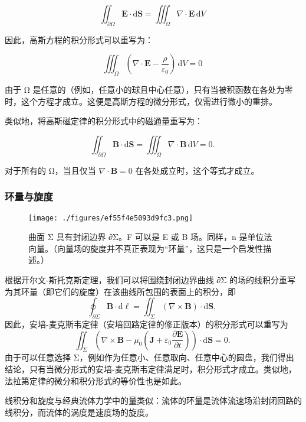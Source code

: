 \[\iint_{\scriptstyle \partial \Omega} \mathbf{E} \cdot \mathrm{d} \mathbf{S} = \iiint_{\Omega} \nabla \cdot \mathbf{E} \, \mathrm{d} V~\]

因此，高斯方程的积分形式可以重写为：

\[\iiint_{\Omega} \left(\nabla \cdot \mathbf{E} - \frac{\rho}{\varepsilon_0}\right) \, \mathrm{d} V = 0~\]

由于 Ω 是任意的（例如，任意小的球且中心任意），只有当被积函数在各处为零时，这个方程才成立。这便是高斯方程的微分形式，仅需进行微小的重排。

类似地，将高斯磁定律的积分形式中的磁通量重写为：

\[\iint_{\scriptstyle \partial \Omega} \mathbf{B} \cdot \mathrm{d} \mathbf{S} = \iiint_{\Omega} \nabla \cdot \mathbf{B} \, \mathrm{d} V = 0.~\]

对于所有的 Ω，当且仅当 \(\nabla \cdot \mathbf{B} = 0\) 在各处成立时，这个等式才成立。
\subsubsection{环量与旋度}
\begin{figure}[ht]
\centering
\texttt{[image: ./figures/ef55f4e5093d9fc3.png]}
\caption{曲面 Σ 具有封闭边界 ∂Σ。F 可以是 E 或 B 场。同样，n 是单位法向量。（向量场的旋度并不真正表现为“环量”，这只是一个启发性描述。）} \label{fig_MAXS_8}
\end{figure}
根据开尔文-斯托克斯定理，我们可以将围绕封闭边界曲线 ∂Σ 的场的线积分重写为其环量（即它们的旋度）在该曲线所包围的表面上的积分，即
\[
\oint _{\partial \Sigma }\mathbf {B} \cdot \mathrm {d} {\boldsymbol {\ell }}=\iint _{\Sigma }(\nabla \times \mathbf {B} )\cdot \mathrm {d} \mathbf {S} ,~
\]
因此，安培-麦克斯韦定律（安培回路定律的修正版本）的积分形式可以重写为
\[
\iint _{\Sigma }\left(\nabla \times \mathbf {B} -\mu _{0}\left(\mathbf {J} +\varepsilon _{0}{\frac {\partial \mathbf {E} }{\partial t}}\right)\right)\cdot \mathrm {d} \mathbf {S} =0.~
\]
由于可以任意选择 Σ，例如作为任意小、任意取向、任意中心的圆盘，我们得出结论，只有当微分形式的安培-麦克斯韦定律满足时，积分形式才成立。类似地，法拉第定律的微分和积分形式的等价性也是如此。

线积分和旋度与经典流体力学中的量类似：流体的环量是流体流速场沿封闭回路的线积分，而流体的涡度是速度场的旋度。
